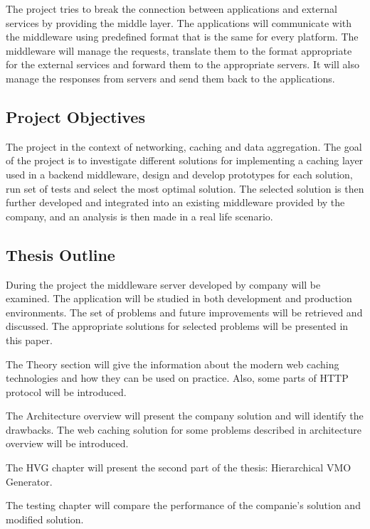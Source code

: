The project tries to break the connection between applications and external services by providing the middle layer. The applications will communicate with the middleware using predefined format that is the same for every platform. The middleware will manage the requests, translate them to the format appropriate for the external services and forward them to the appropriate servers. It will also manage the responses from servers and send them back to the applications.


\subsection{Project Objectives}

The project in the context of networking, caching and data aggregation. The goal of the project is to investigate different solutions for implementing a caching layer used in a backend middleware, design and develop prototypes for each solution, run set of tests and select the most optimal solution.
The selected solution is then further developed and integrated into an existing middleware provided by the company, and an analysis is then made in a real life scenario.


\subsection{Thesis Outline}

During the project the middleware server developed by company will be examined. The application will be studied in both development and production environments. The set of problems and future improvements will be retrieved and discussed. The appropriate solutions for selected problems will be presented in this paper.

The Theory section will give the information about the modern web caching technologies and how they can be used on practice. Also, some parts of HTTP protocol will be introduced.

The Architecture overview will present the company solution and will identify the drawbacks. The web caching solution for some problems described in architecture overview will be introduced.

The HVG chapter will present the second part of the thesis: Hierarchical VMO Generator.

The testing chapter will compare the performance of the companie’s solution and modified solution.

\newpage
